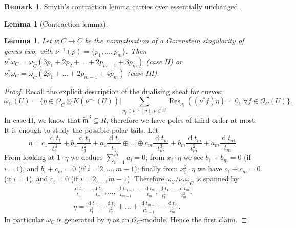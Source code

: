 \documentclass[11pt]{amsart}
\newcommand{\tm}{\widetilde{\mathfrak m}}
\newcommand{\OO}{\mathcal O}
\renewcommand{\to}{\rightarrow}
\theoremstyle{plain}
\newtheorem{lem}[thm]{Lemma}
\theoremstyle{definition}
\newtheorem{rem}[thm]{Remark}
\begin{document}
\begin{rem}
 Smyth's contraction lemma \cite[Lemma 2.13]{SMY1} carries over essentially unchanged.
\end{rem}

\begin{lem}[Contraction lemma]\label{lem:contraction}
 
\end{lem}


\begin{lem}
 Let $\nu\colon\tilde C\to C$ be the normalisation of a Gorenstein singularity of genus two, with $\nu^{-1}(p)=\{p_1,\ldots,p_m\}$. Then $\nu^*\omega_C=\omega_{\tilde C}(3p_1+2p_2+\ldots+2p_{m-1}+3p_m)$ (case II) or $\nu^*\omega_C=\omega_{\tilde C}(2p_1+\ldots+2p_{m-1}+4p_m)$ (case III).
\end{lem}
\begin{proof}
 Recall the explicit description of the dualising sheaf for curves:
 \[\omega_C(U)=\{\eta\in \Omega_{\tilde C}\otimes K(\nu^{-1}(U)) | \sum_{p_i\in\nu^{-1}(p),p\in U}\operatorname{Res}_{p_i}((\nu^*f)\eta)=0,\ \forall f\in\OO_C(U)\}.\]
 In case II, we know that $\tm^3\subseteq R$, therefore we have poles of third order at most. It is enough to study the possible polar tails. Let \[\eta=c_1\frac{\operatorname{d}t_1}{t_1^3}+b_1\frac{\operatorname{d}t_1}{t_1^2}+a_1\frac{\operatorname{d}t_1}{t_1}\oplus\ldots\oplus c_m\frac{\operatorname{d}t_m}{t_m^3}+b_m\frac{\operatorname{d}t_m}{t_m^2}+a_m\frac{\operatorname{d}t_m}{t_m}.\]
 From looking at $1\cdot\eta$ we deduce $\sum_{i=1}^m a_i=0$; from $x_i\cdot\eta$ we see $b_1+b_m=0$ (if $i=1$), and $b_i+c_m=0$ (if $i=2,\ldots,m-1$); finally from $x_i^2\cdot\eta$ we have $c_1+c_m=0$ (if $i=1$), and $c_i=0$ (if $i=2,\ldots,m-1$). Therefore $\omega_C/\nu_*\omega_{\tilde C}$ is spanned by
 \begin{align*}
  \frac{\operatorname{d}t_1}{t_1}-\frac{\operatorname{d}t_m}{t_m},\ldots,\frac{\operatorname{d}t_{m-1}}{t_{m-1}}-\frac{\operatorname{d}t_m}{t_m},\frac{\operatorname{d}t_1}{t_1^2}-\frac{\operatorname{d}t_m}{t_m^2},\\
  \bar{\eta}=\frac{\operatorname{d}t_1}{t_1^3}+\frac{\operatorname{d}t_2}{t_2^2}+\ldots+\frac{\operatorname{d}t_{m-1}}{t_{m-1}^2}-\frac{\operatorname{d}t_m}{t_m^3}.
 \end{align*}
In particular $\omega_C$ is generated by $\bar{\eta}$ as an $\OO_C$-module. Hence the first claim.


\end{proof}
\end{document}
